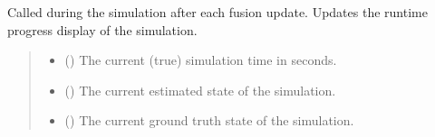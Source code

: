 \documentclass[letterpaper,10pt,english]{sphinxmanual}
\begin{document}
\begin{fulllineitems}
\begin{fulllineitems}
\label{\detokenize{modules/simulation/display:qnav.simulation.display.ConsoleDisplay.on_update}}
\pysigstartsignatures
{}
\pysigstopsignatures
\sphinxAtStartPar
Called during the simulation after each fusion update.
Updates the runtime progress display of the simulation.
\begin{quote}\begin{description}
\begin{itemize}
\item {} 
\sphinxAtStartPar
{} () \textendash{} The current (true) simulation time in seconds.

\item {} 
\sphinxAtStartPar
{} ({\hyperref[\detokenize{modules/estimation/state:qnav.estimation.state.EstimatedState}]{}}) \textendash{} The current estimated state of the simulation.

\item {} 
\sphinxAtStartPar
{} ({\hyperref[\detokenize{modules/waypoints/trajectory:qnav.waypoints.trajectory.GroundTruth}]{}}) \textendash{} The current ground truth state of the simulation.

\end{itemize}

\end{description}\end{quote}

\end{fulllineitems}



\end{fulllineitems}
\end{document}
